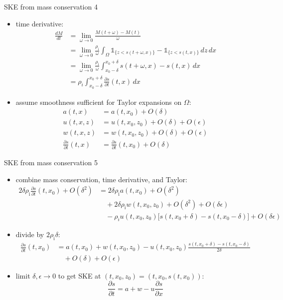 \documentclass[10pt,dvipsnames]{beamer}
\newcommand{\eps}{\epsilon}
\newcommand{\rhoi}{\rho_{\text{i}}}
\begin{document}
\begin{frame}{SKE from mass conservation 4}

\begin{itemize}
\item time derivative:
\begin{align*}
\frac{dM}{dt} &= \lim_{\omega\to 0} \frac{M(t+\omega) - M(t)}{\omega} \\
    &= \lim_{\omega\to 0} \frac{\rhoi}{\omega} \int_\Omega \mathbb{1}_{\{z<s(t+\omega,x)\}} - \mathbb{1}_{\{z<s(t,x)\}}\,dz\,dx \\
    &= \lim_{\omega\to 0} \frac{\rhoi}{\omega} \int_{x_0-\delta}^{x_0+\delta} s(t+\omega,x) - s(t,x)\,dx \\
    &= \rho_i \int_{x_0-\delta}^{x_0+\delta} \frac{\partial s}{\partial t}(t,x)\,dx
\end{align*}
\item assume smoothness sufficient for Taylor expansions on $\Omega$:
\begin{align*}
a(t,x) &= a(t,x_0) + O(\delta) \\
u(t,x,z) &= u(t,x_0,z_0) + O(\delta) + O(\eps) \\
w(t,x,z) &= w(t,x_0,z_0) + O(\delta) + O(\eps) \\
\frac{\partial s}{\partial t}(t,x) &= \frac{\partial s}{\partial t}(t,x_0) + O(\delta)
\end{align*}
\end{itemize}
\end{frame}


\begin{frame}{SKE from mass conservation 5}

\begin{itemize}
\item combine mass conservation, time derivative, and Taylor:
\begin{align*}
2\delta \rhoi \frac{\partial s}{\partial t}(t,x_0) + O(\delta^2) &= 2\delta \rhoi a(t,x_0) + O(\delta^2) \\
  &\quad + 2\delta \rhoi w(t,x_0,z_0) + O(\delta^2) + O(\delta \eps) \\
  &\quad - \rho_i u(t,x_0,z_0) \Big[s(t,x_0+\delta) - s(t,x_0-\delta)\Big] + O(\delta \eps)
\end{align*}
\item divide by $2\rhoi\delta$:
\begin{align*}
\frac{\partial s}{\partial t}(t,x_0) &= a(t,x_0) + w(t,x_0,z_0) - u(t,x_0,z_0) \frac{s(t,x_0+\delta) - s(t,x_0-\delta)}{2\delta} \\
  &\quad  + O(\delta) + O(\eps)
\end{align*}
\item limit $\delta, \eps \to 0$ to get SKE at $(t,x_0,z_0) = (t,x_0,s(t,x_0))$:
  $$\frac{\partial s}{\partial t} = a + w - u \frac{\partial s}{\partial x}$$
\end{itemize}
\end{frame}
\end{document}
